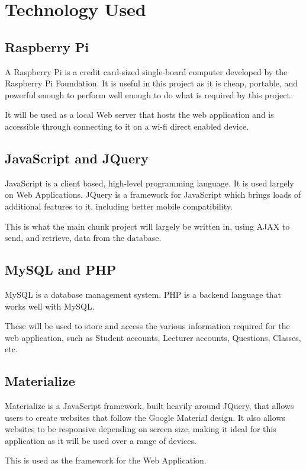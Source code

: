 \documentclass{article}
\begin{document}
\section{Technology Used}
\subsection{Raspberry Pi}
A Raspberry Pi is a credit card-sized single-board computer developed by the Raspberry Pi Foundation. It is useful in this project as it is cheap, portable, and powerful enough to perform well enough to do what is required by this project. 

It will be used as a local Web server that hosts the web application and is accessible through connecting to it on a wi-fi direct enabled device.

\subsection{JavaScript and JQuery}
JavaScript is a client based, high-level programming language. It is used largely on Web Applications. JQuery is a framework for JavaScript which brings loads of additional features to it, including better mobile compatibility. 

This is what the main chunk project will largely be written in, using AJAX to send, and retrieve, data from the database.

\subsection{MySQL and PHP}
MySQL is a database management system. PHP is a backend language that works well with MySQL.

These will be used to store and access the various information required for the web application, such as Student accounts, Lecturer accounts, Questions, Classes, etc. 

\subsection{Materialize}
Materialize is a JavaScript framework, built heavily around JQuery, that allows users to create websites that follow the Google Material design. It also allows websites to be responsive depending on screen size, making it ideal for this application as it will be used over a range of devices.

This is used as the framework for the Web Application.
\end{document}

